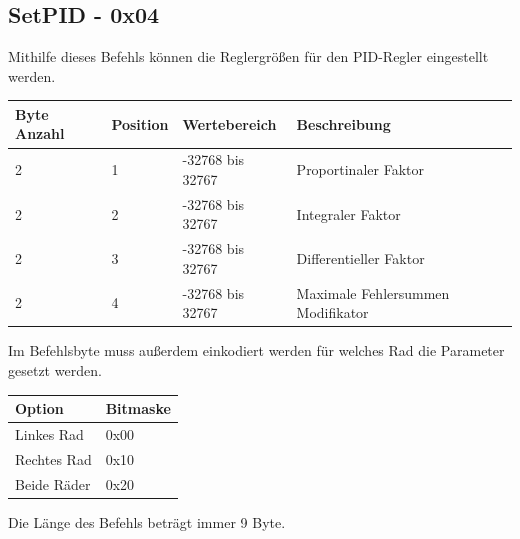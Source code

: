 \documentclass[a4paper]{article}
\begin{document}
	\subsection{SetPID - 0x04}

	Mithilfe dieses Befehls können die Reglergrößen für den PID-Regler eingestellt werden.

	\begin{tabularx}{\linewidth}{|l|l|l|X|}
		\hline
		\textbf{Byte Anzahl} & \textbf{Position} & \textbf{Wertebereich} & \textbf{Beschreibung} \\
		\hline
		\hline
		2					 & 1 & -32768 bis 32767 & Proportinaler Faktor\\
		\hline
		2					 & 2 & -32768 bis 32767 & Integraler Faktor\\
		\hline
		2					 & 3 & -32768 bis 32767 & Differentieller Faktor\\
		\hline
		2					 & 4 & -32768 bis 32767 & Maximale Fehlersummen Modifikator\\
		\hline
	\end{tabularx}

	Im Befehlsbyte muss außerdem einkodiert werden für welches Rad die Parameter gesetzt werden.

	\begin{tabularx}{\linewidth}{|l|X|}
		\hline
		\textbf{Option} & \textbf{Bitmaske} \\
		\hline
		\hline
		Linkes Rad	& 0x00 \\
		\hline
		Rechtes Rad	& 0x10 \\
		\hline
		Beide Räder & 0x20 \\
		\hline
	\end{tabularx}

	Die Länge des Befehls beträgt immer 9 Byte.
	
\end{document}
